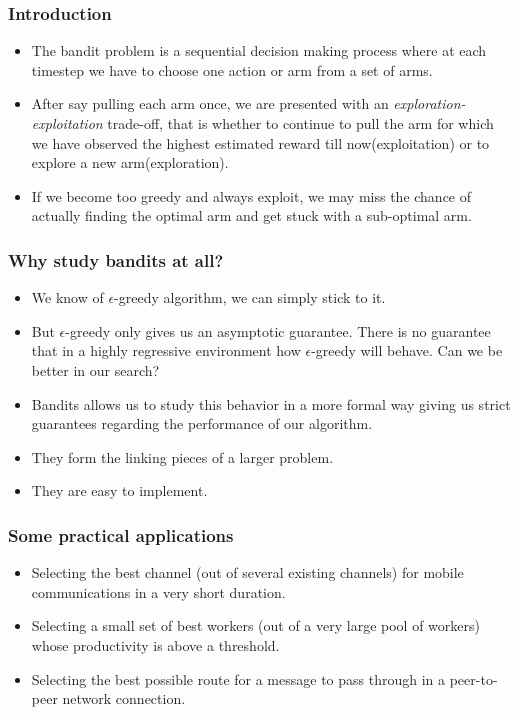 \begin{frame}
\frametitle{Introduction}
\begin{itemize}
\item<1-> The bandit problem is a sequential decision making process where at each timestep we have to choose one action or arm from a set of arms. 
\item<2-> After say pulling each arm once, we are presented with an \emph{exploration-exploitation}  trade-off, that is whether to continue to pull the arm for which we have observed the highest estimated reward till now(exploitation) or to explore a new arm(exploration). 
\item<3-> If we become too greedy and always exploit, we may miss the chance of actually finding the optimal arm and get stuck with a sub-optimal arm.
\end{itemize}
\end{frame}

\begin{frame}
\frametitle{Why study bandits at all?}
\begin{itemize}
\item<1-> We know of $\epsilon$-greedy \cite{sutton1998reinforcement} algorithm, we can simply stick to it.
\item<2-> But $\epsilon$-greedy only gives us an asymptotic guarantee. There is no guarantee that in a highly regressive environment how $\epsilon$-greedy will behave. Can we be better in our search?
\item<3-> Bandits allows us to study this behavior in a more formal way giving us strict guarantees regarding the performance of our algorithm.
\item<4-> They form the linking pieces of a larger problem.
\item<5-> They are easy to implement.    
\end{itemize}
\end{frame}

\begin{frame}
\frametitle{Some practical applications}
\begin{itemize}
\item<1-> Selecting the best channel (out of several existing channels) for mobile communications in a very short duration.
\item<2-> Selecting a small set of best workers (out of a very large pool of workers) whose productivity is above a threshold.
\item<3-> Selecting the best possible route for a message to pass through in a peer-to-peer network connection.
\end{itemize}
\end{frame}
